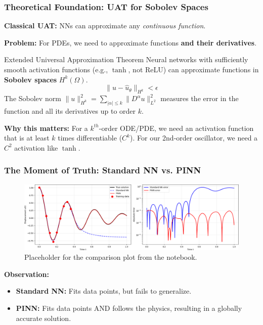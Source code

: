 \documentclass[notes]{beamer}
\begin{document}
\begin{frame}
\frametitle{Theoretical Foundation: UAT for Sobolev Spaces}

\textbf{Classical UAT:} NNs can approximate any \textit{continuous function}.

\textbf{Problem:} For PDEs, we need to approximate functions \textbf{and their derivatives}.

\begin{block}{Extended Universal Approximation Theorem}
Neural networks with sufficiently smooth activation functions (e.g., $\tanh$, not ReLU) can approximate functions in \textbf{Sobolev spaces} $H^k(\Omega)$.
\begin{equation*}
\|u - \hat{u}_\theta\|_{H^k} < \epsilon
\end{equation*}
The Sobolev norm $\|u\|_{H^k}^2 = \sum_{|\alpha| \leq k} \|D^\alpha u\|_{L^2}^2$ measures the error in the function and all its derivatives up to order $k$.
\end{block}

\textbf{Why this matters:} For a $k^{th}$-order ODE/PDE, we need an activation function that is at least $k$ times differentiable ($C^k$). For our 2nd-order oscillator, we need a $C^2$ activation like $\tanh$.

\end{frame}

\begin{frame}
\frametitle{The Moment of Truth: Standard NN vs. PINN}

\begin{figure}[ht]
	\centering
	\includegraphics[width=\textwidth]{figs/pinn-nn-comparison.png}
	\caption*{Placeholder for the comparison plot from the notebook.}
\end{figure}

\textbf{Observation:}
\begin{itemize}
    \item \textbf{Standard NN:} Fits data points, but fails to generalize.
    \item \textbf{PINN:} Fits data points AND follows the physics, resulting in a globally accurate solution.
\end{itemize}

\end{frame}
\end{document}
